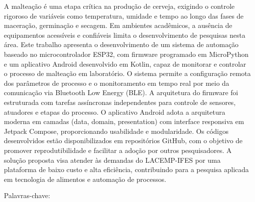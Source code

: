 \begin{resumo}
  \vspace{-15pt}
  
  A malteação é uma etapa crítica na produção de cerveja, exigindo o controle rigoroso de variáveis como temperatura, umidade e tempo ao longo das fases de maceração, germinação e secagem. Em ambientes acadêmicos, a ausência de equipamentos acessíveis e confiáveis limita o desenvolvimento de pesquisas nesta área. Este trabalho apresenta o desenvolvimento de um sistema de automação baseado no microcontrolador ESP32, com firmware programado em MicroPython e um aplicativo Android desenvolvido em Kotlin, capaz de monitorar e controlar o processo de malteação em laboratório. O sistema permite a configuração remota dos parâmetros de processo e o monitoramento em tempo real por meio da comunicação via Bluetooth Low Energy (BLE). A arquitetura do firmware foi estruturada com tarefas assíncronas independentes para controle de sensores, atuadores e etapas do processo. O aplicativo Android adota a arquitetura moderna em camadas (data, domain, presentation) com interface responsiva em Jetpack Compose, proporcionando usabilidade e modularidade. Os códigos desenvolvidos estão disponibilizados em repositórios GitHub, com o objetivo de promover reprodutibilidade e facilitar a adoção por outros pesquisadores. A solução proposta visa atender às demandas do LACEMP-IFES por uma plataforma de baixo custo e alta eficiência, contribuindo para a pesquisa aplicada em tecnologia de alimentos e automação de processos.

  Palavras-chave: \palavraschaveemlinha
\end{resumo}


